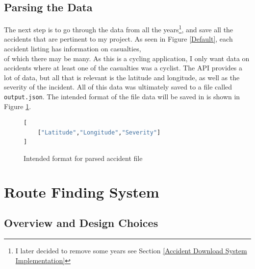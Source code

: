 \documentclass[11pt,twoside,a4paper]{report}
\begin{document}
\subsection{Parsing the Data}
The next step is to go through the data from all the years\footnote{I later decided to remove some years see Section \ref{Accident Download System Implementation}}, and save all the accidents that are pertinent to my project. As seen in Figure \ref{Default}, each accident listing has information on casualties,\\
of which there may be many. As this is a cycling application, I only want data on accidents where at least one of the casualties was a cyclist. The API provides a lot of data, but all that is relevant is
the latitude and longitude, as well as the severity of the incident. All of this data was ultimately saved to a file called \texttt{output.json}.
 The intended format of the file data will be saved in is shown in Figure \ref{accident format}.
\begin{figure}[t]
\begin{lstlisting}[language=Python]
[
    ["Latitude","Longitude","Severity"]
]
\end{lstlisting}
\caption{Intended format for parsed accident file}
\label{accident format}
\end{figure}
\newpage
\section{Route Finding System}
\subsection{Overview and Design Choices}
\end{document}

